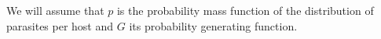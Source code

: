 \documentclass[useAMS,referee,usenatbib]{biom}
\begin{document}


%

\appendix


\section{}
We will assume that $p$ is the probability mass function of the distribution of parasites per host and $G$ its probability generating function.
\end{document}
